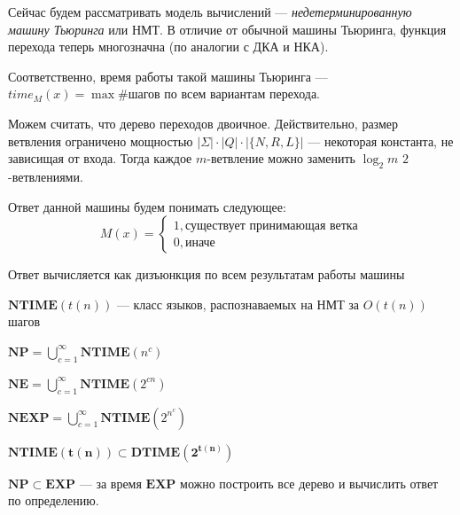 Сейчас будем рассматривать модель вычислений --- \textit{недетерминированную машину Тьюринга} или НМТ. В отличие от обычной машины Тьюринга, функция перехода теперь многозначна (по аналогии с ДКА и НКА). 

Соответственно, время работы такой машины Тьюринга --- \(time_M(x) = \max \#\text{шагов}\) по всем вариантам перехода.

\begin{note}
    Можем считать, что дерево переходов двоичное. Действительно, размер ветвления ограничено мощностью \(|\Sigma|\cdot|Q|\cdot|\{N, R, L\}|\) --- некоторая константа, не зависищая от входа. Тогда каждое \(m\)-ветвление можно заменить \(\log_2 m\) \(2\)-ветвлениями.
\end{note}

Ответ данной машины будем понимать следующее:
\[M(x) = \left\{\begin{array}{l}
    1, \text{существует принимающая ветка} \\
    0, \text{иначе}
\end{array}\right.\]

\begin{note}
    Ответ вычисляется как дизъюнкция по всем результатам работы машины
\end{note}

\begin{definition}
    \(\mathbf{NTIME}(t(n))\) --- класс языков, распознаваемых на НМТ за \(O(t(n))\) шагов
\end{definition}

\begin{definition}
    \(\mathbf{NP} = \bigcup_{c = 1}^\infty \mathbf{NTIME}(n^c)\)
\end{definition}

\begin{definition}
    \(\mathbf{NE} = \bigcup_{c = 1}^\infty \mathbf{NTIME}(2^{cn})\)
\end{definition}

\begin{definition}
    \(\mathbf{NEXP} = \bigcup_{c = 1}^\infty \mathbf{NTIME}(2^{n^c})\)
\end{definition}

\begin{note}
    \(\mathbf{NTIME(t(n))} \subset \mathbf{DTIME(2^{t(n)})}\)
\end{note}

\begin{note}
    \(\mathbf{NP} \subset \mathbf{EXP}\) --- за время \(\mathbf{EXP}\) можно построить все дерево и вычислить ответ по определению.
\end{note}

